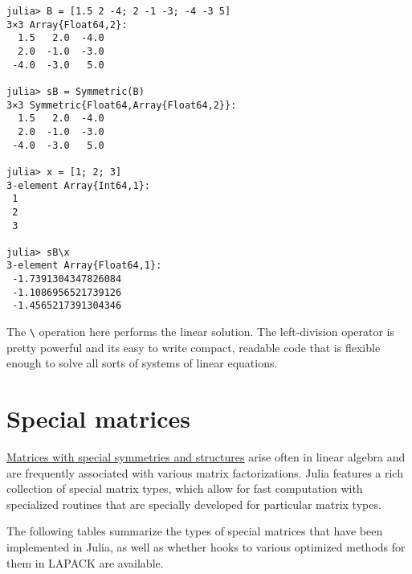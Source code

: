 \begin{verbatim}
julia> B = [1.5 2 -4; 2 -1 -3; -4 -3 5]
3×3 Array{Float64,2}:
  1.5   2.0  -4.0
  2.0  -1.0  -3.0
 -4.0  -3.0   5.0

julia> sB = Symmetric(B)
3×3 Symmetric{Float64,Array{Float64,2}}:
  1.5   2.0  -4.0
  2.0  -1.0  -3.0
 -4.0  -3.0   5.0

julia> x = [1; 2; 3]
3-element Array{Int64,1}:
 1
 2
 3

julia> sB\x
3-element Array{Float64,1}:
 -1.7391304347826084
 -1.1086956521739126
 -1.4565217391304346
\end{verbatim}



The \texttt{{\textbackslash}} operation here performs the linear solution. The left-division operator is pretty powerful and it{\textquotesingle}s easy to write compact, readable code that is flexible enough to solve all sorts of systems of linear equations.



\hypertarget{17886925214388874704}{}


\section{Special matrices}



\href{http://www2.imm.dtu.dk/pubdb/views/publication\_details.php?id=3274}{Matrices with special symmetries and structures} arise often in linear algebra and are frequently associated with various matrix factorizations. Julia features a rich collection of special matrix types, which allow for fast computation with specialized routines that are specially developed for particular matrix types.



The following tables summarize the types of special matrices that have been implemented in Julia, as well as whether hooks to various optimized methods for them in LAPACK are available.




